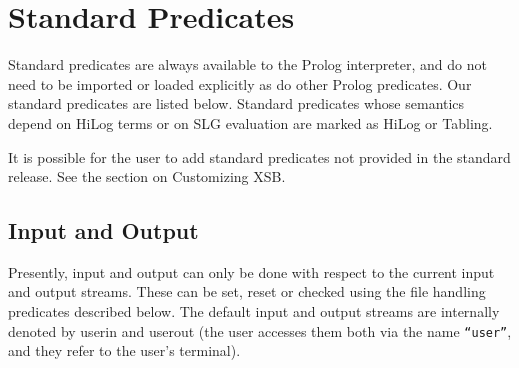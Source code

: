 \chapter{Standard Predicates} \label{standard}

Standard predicates are always available to the Prolog interpreter, and do
not need to be imported or loaded explicitly as do other Prolog predicates.
Our standard predicates are listed below.  Standard predicates whose 
semantics depend on HiLog terms or on SLG evaluation are marked as 
{\sf HiLog} or {\sf Tabling}.

It is possible for the user to add standard predicates not provided
in the standard release. See the section on Customizing XSB.

\section{Input and Output}
Presently, input and output can only be done with respect to the 
current input and output
streams.  These can be set, reset or checked using the file handling
predicates described below.  The default input and output streams are
internally denoted by userin and userout (the user accesses them both 
via the name {\tt ``user''}, and they refer to the user's terminal).


